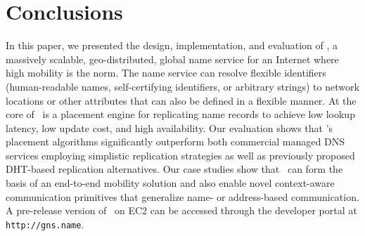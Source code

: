 

\section{Conclusions}

\label{sec:concl}

In this paper, we presented the design, implementation, and evaluation of \auspice, a massively scalable, geo-distributed, global name service for an Internet where high mobility is the norm. The name service can resolve flexible identifiers (human-readable names, self-certifying identifiers, or arbitrary strings) to network locations or other attributes that can also be defined in a flexible manner. At the core of \auspice\ is a placement engine for replicating name records to achieve low lookup latency, low update cost, and high availability. Our evaluation shows that \auspice's placement algorithms significantly outperform both commercial managed DNS services employing simplistic replication strategies as well as previously proposed DHT-based replication alternatives. Our case studies show that \auspice\ can form the basis of an end-to-end mobility solution and also enable novel context-aware communication primitives that generalize name- or address-based communication. A pre-release version of \auspice\ on EC2 can be accessed through the developer portal at \verb+http://gns.name+.


